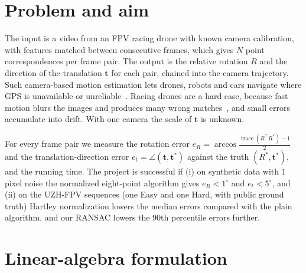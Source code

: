 \documentclass[11pt,a4paper]{article}
\newif\ifshowguide
\DeclareMathOperator{\trace}{trace}
\theoremstyle{plain}
\theoremstyle{definition}
\theoremstyle{remark}
\newcommand{\guide}[1]{\ifshowguide\par\smallskip\noindent
  \colorbox{gray!12}{\parbox{\dimexpr\linewidth-2\fboxsep}{\small\itshape
  \textbf{Guidance.} #1}}\par\smallskip\fi}
\begin{document}
\section{Problem and aim}
\label{sec:problem}

\guide{Criterion A. What goes in, what comes out, and why it matters in
practice. Who uses a solution to this problem, and what goes wrong
without a good one? Give a short overview of the approaches in the
literature and say which ones you chose and why.
\emph{Interim report 1}: half a page.}

The input is a video from an FPV racing drone with known camera calibration, with features matched between consecutive frames, which gives $N$ point correspondences per frame pair. The output is the relative rotation $R$ and the direction of the translation $\mathbf{t}$ for each pair, chained into the camera trajectory. Such camera-based motion estimation lets drones, robots and cars navigate where GPS is unavailable or unreliable~\cite{ScaramuzzaI}. Racing drones are a hard case, because fast motion blurs the images and produces many wrong matches~\cite{UZHFPV}, and small errors accumulate into drift. With one camera the scale of $\mathbf{t}$ is unknown.

For every frame pair we measure the rotation error $e_R=\arccos\frac{\trace(R^{\top}R^{*})-1}{2}$ and the translation-direction error $e_t=\angle(\mathbf{t},\mathbf{t}^{*})$ against the truth $(R^{*},\mathbf{t}^{*})$, and the running time. The project is successful if (i) on synthetic data with $1$ pixel noise the normalized eight-point algorithm gives $e_R<1^{\circ}$ and $e_t<5^{\circ}$, and (ii) on the UZH-FPV sequences (one Easy and one Hard, with public ground truth) Hartley normalization lowers the median errors compared with the plain algorithm, and our RANSAC lowers the $90$th percentile errors further.

\section{Linear-algebra formulation}
\label{sec:formulation}

\guide{Criterion A. State the problem precisely as a linear-algebra
problem: the matrix (its size, its entries, its structure: sparse,
symmetric, positive definite, low rank), the unknowns, and what you need
to do with the matrix. Explain why this structure suggests your methods.
\emph{Interim report 1}: this section is the core of the memo.}
\end{document}
